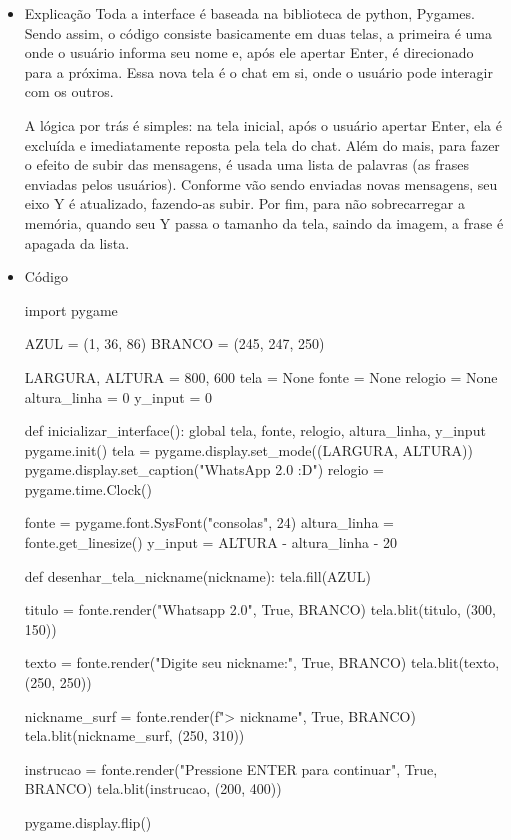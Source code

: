 	\begin{itemize}
		
		\item {Explicação}
		Toda a interface é baseada na biblioteca de python, Pygames. Sendo assim, o código consiste basicamente em duas telas, a primeira é uma onde o usuário informa seu nome e, após ele apertar Enter, é direcionado para a próxima. Essa nova tela é o chat em si, onde o usuário pode interagir com os outros.
		
		A lógica por trás é simples: na tela inicial, após o usuário apertar Enter, ela é excluída e imediatamente reposta pela tela do chat. Além do mais, para fazer o efeito de subir das mensagens, é usada uma lista de palavras (as frases enviadas pelos usuários). Conforme vão sendo enviadas novas mensagens, seu eixo Y é atualizado, fazendo-as subir. Por fim, para não sobrecarregar a memória, quando seu Y passa o tamanho da tela, saindo da imagem, a frase é apagada da lista.
		
		\item {Código}
		\begin{pycode}
			import pygame
			
			AZUL = (1, 36, 86)
			BRANCO = (245, 247, 250)
			
			LARGURA, ALTURA = 800, 600
			tela = None
			fonte = None
			relogio = None
			altura_linha = 0
			y_input = 0
			
			def inicializar_interface():
			global tela, fonte, relogio, altura_linha, y_input
			pygame.init()
			tela = pygame.display.set_mode((LARGURA, ALTURA))
			pygame.display.set_caption("WhatsApp 2.0 :D")
			relogio = pygame.time.Clock()
			
			fonte = pygame.font.SysFont("consolas", 24)
			altura_linha = fonte.get_linesize()
			y_input = ALTURA - altura_linha - 20
			
			def desenhar_tela_nickname(nickname):
			tela.fill(AZUL)
			
			titulo = fonte.render("Whatsapp 2.0", True, BRANCO)
			tela.blit(titulo, (300, 150))
			
			texto = fonte.render("Digite seu nickname:", True, BRANCO)
			tela.blit(texto, (250, 250))
			
			nickname_surf = fonte.render(f"> {nickname}", True, BRANCO)
			tela.blit(nickname_surf, (250, 310))
			
			instrucao = fonte.render("Pressione ENTER para continuar", True, BRANCO)
			tela.blit(instrucao, (200, 400))
			
			pygame.display.flip()
			

\end{pycode}
\end{itemize}
